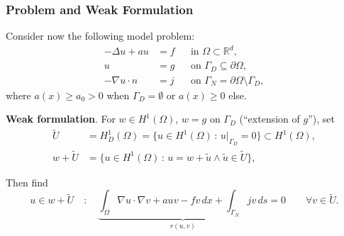 \begin{frame}
\frametitle{Problem and Weak Formulation}
Consider now the following model problem:
\begin{subequations} \label{Eq:Example02}
\begin{align}
 -\Delta u + a u  &= f &&\text{in $\Omega\subset\mathbb{R}^d$},\\
                u &= g &&\text{on $\Gamma_D\subseteq\partial\Omega$},\\
-\nabla u \cdot n &= j &&\text{on $\Gamma_N=\partial\Omega\setminus\Gamma_D$},
\end{align}
\end{subequations}
where $a(x)\geq a_0 >0$ when $\Gamma_D=\emptyset$ or $a(x)\geq 0$ else.

\textbf{Weak formulation}. For $w\in H^1(\Omega)$, $w = g$ on
$\Gamma_D$ (``extension of $g$''), set
\begin{align*}
\tilde{U} &= H_D^1(\Omega) = \{ u \in H^1(\Omega) \,:\, u|_{\Gamma_D}=0 \} \subset H^1(\Omega), \\
w + \tilde{U} &= \{ u \in H^1(\Omega) \,:\, u = w+\tilde{u} \wedge \tilde{u}\in\tilde{U}\},
\end{align*}

Then find
\begin{equation*}
u\in w+\tilde{U} \quad : \quad \underbrace{\int_\Omega \nabla u \cdot \nabla v +
a u v - f v \,dx + \int_{\Gamma_N} j v \,ds}_{r(u,v)} = 0 \qquad \forall v\in\tilde{U}.
\end{equation*}
\end{frame}

